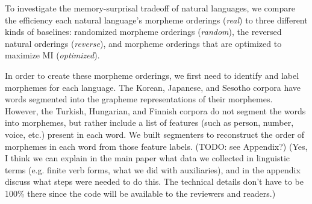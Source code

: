 \documentclass[11pt,letterpaper]{article}
\newcommand\mhahn[1]{{\color{red}(#1)}}
\newcommand\becky[1]{{\color{blue}(#1)}}
\begin{document}
To investigate the memory-surprisal tradeoff of natural languages, we compare the efficiency each natural language's morpheme orderings (\textit{real}) to three different kinds of baselines: randomized morpheme orderings (\textit{random}), the reversed natural orderings (\textit{reverse}), and morpheme orderings that are optimized to maximize MI (\textit{optimized}). 

In order to create these morpheme orderings, we first need to identify and label morphemes for each language. The Korean, Japanese, and Sesotho corpora have words segmented into the grapheme representations of their morphemes. However, the Turkish, Hungarian, and Finnish corpora do not segment the words into morphemes, but rather include a list of features (such as person, number, voice, etc.) present in each word. We built segmenters to reconstruct the order of morphemes in each word from those feature labels.
\becky{TODO: see Appendix?} \mhahn{Yes, I think we can explain in the main paper what data we collected in linguistic terms (e.g. finite verb forms, what we did with auxiliaries), and in the appendix discuss what steps were needed to do this. The technical details don't have to be 100\% there since the code will be available to the reviewers and readers.}
\end{document}
